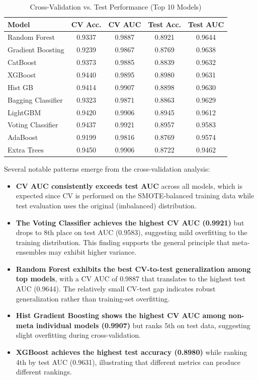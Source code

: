 \documentclass[conference,10pt]{IEEEtran}
\begin{document}
\begin{table}[!t]
\centering
\caption{Cross-Validation vs. Test Performance (Top 10 Models)}
\label{tab:cv_results}
\small
\begin{tabular}{lcccc}
\toprule
\textbf{Model} & \textbf{CV Acc.} & \textbf{CV AUC} & \textbf{Test Acc.} & \textbf{Test AUC} \\
\midrule
Random Forest      & 0.9337 & 0.9887 & 0.8921 & 0.9644 \\
Gradient Boosting  & 0.9239 & 0.9867 & 0.8769 & 0.9638 \\
CatBoost           & 0.9373 & 0.9885 & 0.8839 & 0.9632 \\
XGBoost            & 0.9440 & 0.9895 & 0.8980 & 0.9631 \\
Hist GB            & 0.9414 & 0.9907 & 0.8898 & 0.9630 \\
Bagging Classifier & 0.9323 & 0.9871 & 0.8863 & 0.9629 \\
LightGBM           & 0.9420 & 0.9906 & 0.8945 & 0.9612 \\
Voting Classifier  & 0.9437 & 0.9921 & 0.8957 & 0.9583 \\
AdaBoost           & 0.9199 & 0.9816 & 0.8769 & 0.9574 \\
Extra Trees        & 0.9450 & 0.9906 & 0.8722 & 0.9462 \\
\bottomrule
\end{tabular}
\end{table}

Several notable patterns emerge from the cross-validation analysis:

\begin{itemize}
    \item \textbf{CV AUC consistently exceeds test AUC} across all models, which is expected since CV is performed on the SMOTE-balanced training data while test evaluation uses the original (imbalanced) distribution.

    \item \textbf{The Voting Classifier achieves the highest CV AUC (0.9921)} but drops to 8th place on test AUC (0.9583), suggesting mild overfitting to the training distribution. This finding supports the general principle that meta-ensembles may exhibit higher variance.

    \item \textbf{Random Forest exhibits the best CV-to-test generalization among top models}, with a CV AUC of 0.9887 that translates to the highest test AUC (0.9644). The relatively small CV-test gap indicates robust generalization rather than training-set overfitting.

    \item \textbf{Hist Gradient Boosting shows the highest CV AUC among non-meta individual models (0.9907)} but ranks 5th on test data, suggesting slight overfitting during cross-validation.

    \item \textbf{XGBoost achieves the highest test accuracy (0.8980)} while ranking 4th by test AUC (0.9631), illustrating that different metrics can produce different rankings.
\end{itemize}
\end{document}
